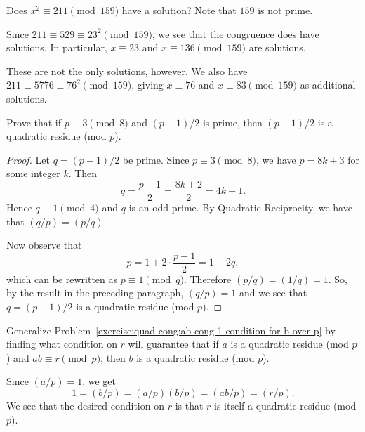  Does $x^2\equiv211\pmod{159}$ have a solution? Note that
$159$ is not prime.
\begin{solution}
  Since $211\equiv529\equiv23^2\pmod{159}$, we see that the congruence
  does have solutions. In particular, $x\equiv23$ and
  $x\equiv136\pmod{159}$ are solutions.

  These are not the only solutions, however. We also have
  $211\equiv5776\equiv76^2\pmod{159}$, giving $x\equiv76$ and
  $x\equiv83\pmod{159}$ as additional solutions.
\end{solution}

 Prove that if $p\equiv3\pmod8$ and $(p-1)/2$ is prime,
then $(p-1)/2$ is a quadratic residue (mod $p$).
\begin{proof}
  Let $q = (p-1)/2$ be prime. Since $p\equiv3\pmod8$, we have
  $p = 8k + 3$ for some integer $k$. Then
  \begin{equation*}
    q = \frac{p-1}2 = \frac{8k + 2}2 = 4k + 1.
  \end{equation*}
  Hence $q\equiv1\pmod4$ and $q$ is an odd prime. By Quadratic
  Reciprocity, we have that $(q/p) = (p/q)$.

  Now observe that
  \begin{equation*}
    p = 1 + 2\cdot\frac{p-1}2 = 1 + 2q,
  \end{equation*}
  which can be rewritten as $p\equiv1\pmod{q}$. Therefore
  $(p/q) = (1/q) = 1$. So, by the result in the preceding paragraph,
  $(q/p) = 1$ and we see that $q = (p-1)/2$ is a quadratic residue
  (mod $p$).
\end{proof}

 Generalize
Problem~\ref{exercise:quad-cong:ab-cong-1-condition-for-b-over-p} by
finding what condition on $r$ will guarantee that if $a$ is a
quadratic residue (mod $p$) and $ab\equiv r\pmod{p}$, then $b$ is a
quadratic residue (mod $p$).
\begin{solution}
  Since $(a/p) = 1$, we get
  \begin{equation*}
    1 = (b/p) = (a/p)(b/p) = (ab/p) = (r/p).
  \end{equation*}
  We see that the desired condition on $r$ is that $r$ is itself a
  quadratic residue (mod $p$).
\end{solution}

